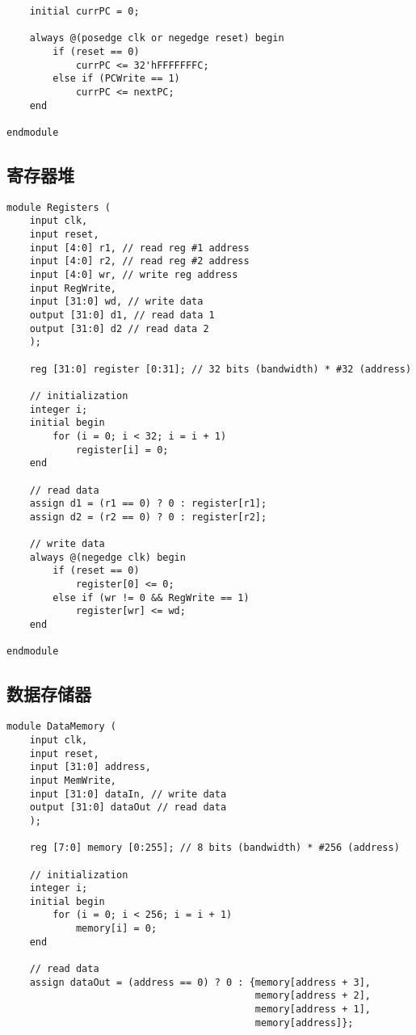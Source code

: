 \begin{multicols}{2}
\begin{lstlisting}
    initial currPC = 0;

    always @(posedge clk or negedge reset) begin
        if (reset == 0)
            currPC <= 32'hFFFFFFFC;
        else if (PCWrite == 1)
            currPC <= nextPC;
    end

endmodule
\end{lstlisting}

\subsection{寄存器堆}
\begin{lstlisting}
module Registers (
    input clk,
    input reset,
    input [4:0] r1, // read reg #1 address
    input [4:0] r2, // read reg #2 address
    input [4:0] wr, // write reg address
    input RegWrite,
    input [31:0] wd, // write data
    output [31:0] d1, // read data 1
    output [31:0] d2 // read data 2
    );
    
    reg [31:0] register [0:31]; // 32 bits (bandwidth) * #32 (address)
    
    // initialization
    integer i;
    initial begin
        for (i = 0; i < 32; i = i + 1)
            register[i] = 0;
    end

    // read data
    assign d1 = (r1 == 0) ? 0 : register[r1];
    assign d2 = (r2 == 0) ? 0 : register[r2];

    // write data
    always @(negedge clk) begin
        if (reset == 0)
            register[0] <= 0;
        else if (wr != 0 && RegWrite == 1)
            register[wr] <= wd;
    end

endmodule
\end{lstlisting}

\subsection{数据存储器}
\begin{lstlisting}
module DataMemory (
    input clk,
    input reset,
    input [31:0] address,
    input MemWrite,
    input [31:0] dataIn, // write data
    output [31:0] dataOut // read data
    );
    
    reg [7:0] memory [0:255]; // 8 bits (bandwidth) * #256 (address)

    // initialization
    integer i;
    initial begin
        for (i = 0; i < 256; i = i + 1)
            memory[i] = 0;
    end

    // read data
    assign dataOut = (address == 0) ? 0 : {memory[address + 3],
                                           memory[address + 2],
                                           memory[address + 1],
                                           memory[address]};


\end{lstlisting}
\end{multicols}

